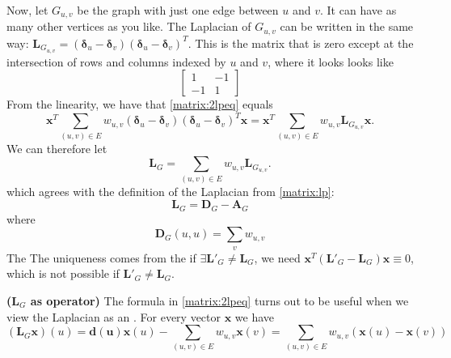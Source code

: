 \documentclass{article}
\newcommand{\bsl}[1]{\boldsymbol{#1}}
\newcommand{\bfs}[1]{\textbf{({#1}) }}
\begin{document}

Now, let $G_{u, v}$ be the graph with just one edge between $u$ and $v .$ It can have as many other vertices as you like. The Laplacian of $G_{u, v}$ can be written in the same way: $\boldsymbol{L}_{G_{u, v}}=\left(\boldsymbol{\delta}_{u}-\boldsymbol{\delta}_{v}\right)\left(\boldsymbol{\delta}_{u}-\boldsymbol{\delta}_{v}\right)^{T}$.
This is the matrix that is zero except at the intersection of rows and columns indexed by $u$ and $v$, where it looks looks like
$$
\left[\begin{array}{rr}
1 & -1 \\
-1 & 1
\end{array}\right]
$$
From the linearity, we have that \cref{matrix:2lpeq} equals
$$\bsl{x}^T\sum_{(u, v) \in E} w_{u, v}\left(\boldsymbol{\delta}_{u}-\boldsymbol{\delta}_{v}\right)\left(\boldsymbol{\delta}_{u}-\boldsymbol{\delta}_{v}\right)^{T}\bsl{x}=\bsl{x}^T\sum_{(u, v) \in E} w_{u, v} \boldsymbol{L}_{G_{u, v}}\bsl{x}.
$$
We can therefore let
$$
\boldsymbol{L}_{G}=\sum_{(u, v) \in E} w_{u, v} \boldsymbol{L}_{G_{u, v}}.
$$
which agrees with the definition of the Laplacian from \cref{matrix:lp}:
$$
\boldsymbol{L}_{G}=\boldsymbol{D}_{G}-\boldsymbol{A}_{G}
$$
where
$$
\boldsymbol{D}_{G}(u, u)=\sum_{v} w_{u, v}
$$
The The uniqueness comes from the if $\exists \boldsymbol{L}'_{G}\ne \boldsymbol{L}_{G}$, we need $\bsl{x}^T(\boldsymbol{L}'_{G}- \boldsymbol{L}_{G})\bsl{x} \equiv 0$, which is not possible if $\boldsymbol{L}'_{G}\ne \boldsymbol{L}_{G}$.

\begin{rema}{\bfs{$\boldsymbol{L}_{G}$ as operator}}\label{matrix:lgop}
The formula  in \cref{matrix:2lpeq} turns out to be useful when we view the Laplacian as an . For every vector $\boldsymbol{x}$ we have
$$
\left(\boldsymbol{L}_{G} \boldsymbol{x}\right)(u)=\bsl{d(u)} \boldsymbol{x}(u)-\sum_{(u, v) \in E} w_{u, v} \boldsymbol{x}(v)=\sum_{(u, v) \in E} w_{u, v}(\boldsymbol{x}(u)-\boldsymbol{x}(v))
$$
\end{rema}
\end{document}
